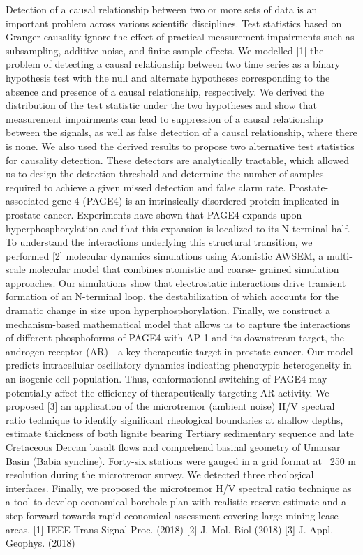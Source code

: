 Detection of a causal relationship between two or more sets of data is an important problem across various scientific disciplines. Test statistics based on Granger causality ignore the effect of practical measurement impairments such as subsampling, additive noise, and finite sample effects. We modelled [1] the problem of detecting a causal relationship between two time series as a binary hypothesis test with the null and alternate hypotheses corresponding to the absence and presence of a causal relationship, respectively. We derived the distribution of the test statistic under the two hypotheses and show that measurement impairments can lead to suppression of a causal relationship between the signals, as well as false detection of a causal relationship, where there is none. We also used the derived results to propose two alternative test statistics for causality detection. These detectors are analytically tractable, which allowed us to design the detection threshold and determine the number of samples required to achieve a given missed detection and false alarm rate.   Prostate-associated gene 4 (PAGE4) is an intrinsically disordered protein implicated in prostate cancer. Experiments have shown that PAGE4 expands upon hyperphosphorylation and that this expansion is localized to its N-terminal half. To understand the interactions underlying this structural transition, we performed [2] molecular dynamics simulations using Atomistic AWSEM, a multi-scale molecular model that combines atomistic and coarse- grained simulation approaches. Our simulations show that electrostatic interactions drive transient formation of an N-terminal loop, the destabilization of which accounts for the dramatic change in size upon hyperphosphorylation. Finally, we construct a mechanism-based mathematical model that allows us to capture the interactions of different phosphoforms of PAGE4 with AP-1 and its downstream target, the androgen receptor (AR)—a key therapeutic target in prostate cancer. Our model predicts intracellular oscillatory dynamics indicating phenotypic heterogeneity in an isogenic cell population. Thus, conformational switching of PAGE4 may potentially affect the efficiency of therapeutically targeting AR activity.   We proposed [3] an application of the microtremor (ambient noise) H/V spectral ratio technique to identify significant rheological boundaries at shallow depths, estimate thickness of both lignite bearing Tertiary sedimentary sequence and late Cretaceous Deccan basalt flows and comprehend basinal geometry of Umarsar Basin (Babia syncline). Forty-six stations were gauged in a grid format at ~250 m resolution during the microtremor survey. We detected three rheological interfaces. Finally, we proposed the microtremor H/V spectral ratio technique as a tool to develop economical borehole plan with realistic reserve estimate and a step forward towards rapid economical assessment covering large mining lease areas.   [1] IEEE Trans Signal Proc. (2018) [2] J. Mol. Biol (2018) [3] J. Appl. Geophys. (2018)


